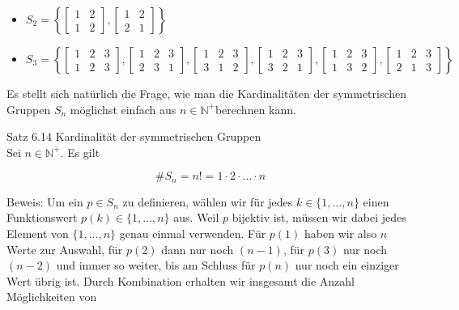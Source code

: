 \documentclass[10pt]{article}
\begin{document}
\begin{itemize}
  \item $S_{2}=\left\{\left[\begin{array}{ll}1 & 2 \\ 1 & 2\end{array}\right],\left[\begin{array}{ll}1 & 2 \\ 2 & 1\end{array}\right]\right\}$
  \item $S_{3}=\left\{\left[\begin{array}{lll}1 & 2 & 3 \\ 1 & 2 & 3\end{array}\right],\left[\begin{array}{lll}1 & 2 & 3 \\ 2 & 3 & 1\end{array}\right],\left[\begin{array}{lll}1 & 2 & 3 \\ 3 & 1 & 2\end{array}\right],\left[\begin{array}{lll}1 & 2 & 3 \\ 3 & 2 & 1\end{array}\right],\left[\begin{array}{lll}1 & 2 & 3 \\ 1 & 3 & 2\end{array}\right],\left[\begin{array}{lll}1 & 2 & 3 \\ 2 & 1 & 3\end{array}\right]\right\}$
\end{itemize}

Es stellt sich natürlich die Frage, wie man die Kardinalitäten der symmetrischen Gruppen $S_{n}$ möglichst einfach aus $n \in \mathbb{N}^{+}$berechnen kann.

Satz 6.14 Kardinalität der symmetrischen Gruppen\\
Sei $n \in \mathbb{N}^{+}$. Es gilt


\begin{equation*}
\# S_{n}=n!=1 \cdot 2 \cdot \ldots \cdot n \tag{6.102}
\end{equation*}


Beweis: Um ein $p \in S_{n}$ zu definieren, wählen wir für jedes $k \in\{1, \ldots, n\}$ einen Funktionswert $p(k) \in\{1, \ldots, n\}$ aus. Weil $p$ bijektiv ist, müssen wir dabei jedes Element von $\{1, \ldots, n\}$ genau einmal verwenden. Für $p(1)$ haben wir also $n$ Werte zur Auswahl, für $p(2)$ dann nur noch $(n-1)$, für $p(3)$ nur noch $(n-2)$ und immer so weiter, bis am Schluss für $p(n)$ nur noch ein einziger Wert übrig ist. Durch Kombination erhalten wir insgesamt die Anzahl Möglichkeiten von
\end{document}
